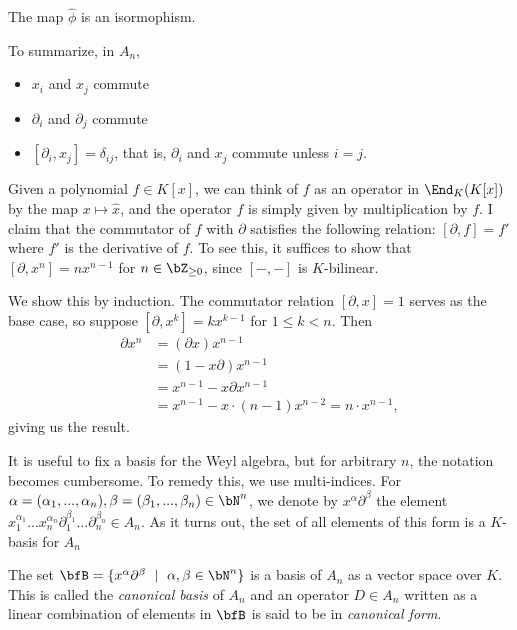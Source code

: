 \begin{thm}\label{thm:Weyl-constructions-iso}
	The map $\hat{\phi}$ is an isormophism.
\end{thm}

\noindent To summarize, in $A_n$,
\begin{itemize}
	\item $x_i$ and $x_j$ commute
	\item $\partial_i$ and $\partial_j$ commute
	\item $[\partial_i,x_j] = \delta_{ij}$, that is, $\partial_i$ and $x_j$ commute unless $i = j$.
\end{itemize}
\begin{example}\label{ex:commutator-as-derivative-one-dim}
    Given a polynomial $f \in K[x]$, we can think of $f$ as an operator in $\End_K(K[x])$ by the map $x \mapsto \hat{x}$, and the operator $f$ is simply given by multiplication by $f$. I claim that the commutator of $f$ with $\partial$ satisfies the following relation: $[\partial, f] = f'$ where $f'$ is the derivative of $f$. To see this, it suffices to show that $[\partial, x^n] = nx^{n-1}$ for $n \in \bZ_{\geq 0}$, since $[-,-]$ is $K$-bilinear.

	We show this by induction. The commutator relation $[\partial,x] = 1$ serves as the base case, so suppose $[\partial, x^k] = kx^{k-1}$ for $1\leq k < n$. Then
	\begin{align*}
		\partial x^n
		&= (\partial x)x^{n-1} \\
		&= (1 - x\partial)x^{n-1} \\
		&= x^{n-1} - x\partial x^{n-1} \\
		&= x^{n-1} - x\cdot (n-1) x^{n-2} = n\cdot x^{n-1},
	\end{align*}
	giving us the result.
\end{example}
It is useful to fix a basis for the Weyl algebra, but for arbitrary $n$, the notation becomes cumbersome. To remedy this, we use multi-indices. For $\alpha = (\alpha_1,...,\alpha_n), \beta = (\beta_1,...,\beta_n)\in \bN^n$, we denote by $x^\alpha\partial^\beta$ the element $x_1^{\alpha_1}...x_n^{\alpha_n}\partial_1^{\beta_1}...\partial_n^{\beta_n} \in A_n$. As it turns out, the set of all elements of this form is a $K$-basis for $A_n$
\begin{prop}\label{prop:canonical-basis}
	The set $\bfB = \{x^\alpha\partial^\beta ~ \mid ~ \alpha,\beta\in \bN^n\}$ is a basis of $A_n$ as a vector space over $K$. This is called the \emph{canonical basis} of $A_n$ and an operator $D \in A_n$ written as a linear combination of elements in $\bfB$ is said to be in \emph{canonical form}.
\end{prop}

